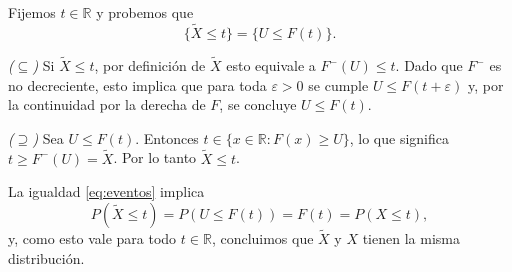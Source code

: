 \documentclass[../Main.tex]{subfiles}
\begin{document}
\begin{demostracion}{}{}
Fijemos $t\in\mathbb R$ y probemos que
\begin{equation}\label{eq:eventos}
    \{\tilde X\le t\}=\{U\le F(t)\}.
\end{equation}

\noindent\textit{($\subseteq$)\;}
Si $\tilde X\le t$, por definición de $\tilde X$ esto equivale a
$F^{-}(U)\le t$.  Dado que $F^{-}$ es no decreciente, esto implica que
para toda $\varepsilon>0$ se cumple $U\le F(t+\varepsilon)$ y,
por la continuidad por la derecha de $F$, se concluye $U\le F(t)$.

\medskip
\noindent\textit{($\supseteq$)\;}
Sea $U\le F(t)$.
Entonces $t\in\{x\in\mathbb R : F(x)\ge U\}$, lo que significa
$t\ge F^{-}(U)=\tilde X$.
Por lo tanto $\tilde X\le t$.

\medskip
La igualdad \eqref{eq:eventos} implica
\[
    P(\tilde X\le t)=P(U\le F(t))=F(t)=P(X\le t),
\]
y, como esto vale para todo $t\in\mathbb R$, concluimos que
$\tilde X$ y $X$ tienen la misma distribución.
\end{demostracion}


\end{document}
